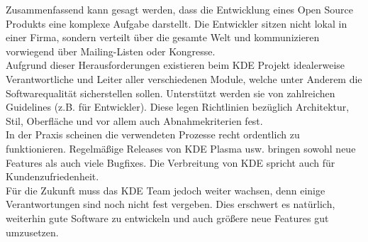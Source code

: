 Zusammenfassend kann gesagt werden, dass die Entwicklung eines Open Source Produkts eine komplexe Aufgabe darstellt. Die Entwickler sitzen nicht lokal in einer Firma, sondern verteilt über die gesamte Welt und kommunizieren vorwiegend über Mailing-Listen oder Kongresse.\\
Aufgrund dieser Herausforderungen existieren beim KDE Projekt idealerweise Verantwortliche und Leiter aller verschiedenen Module, welche unter Anderem die Softwarequalität sicherstellen sollen. Unterstützt werden sie von zahlreichen Guidelines (z.B. für Entwickler). Diese legen Richtlinien bezüglich Architektur, Stil, Oberfläche und vor allem auch Abnahmekriterien fest.\\
In der Praxis scheinen die verwendeten Prozesse recht ordentlich zu funktionieren. Regelmäßige Releases von KDE Plasma usw. bringen sowohl neue Features als auch viele Bugfixes. Die Verbreitung von KDE spricht auch für Kundenzufriedenheit.\\
Für die Zukunft muss das KDE Team jedoch weiter wachsen, denn einige Verantwortungen sind noch nicht fest vergeben. Dies erschwert es natürlich, weiterhin gute Software zu entwickeln und auch größere neue Features gut umzusetzen.